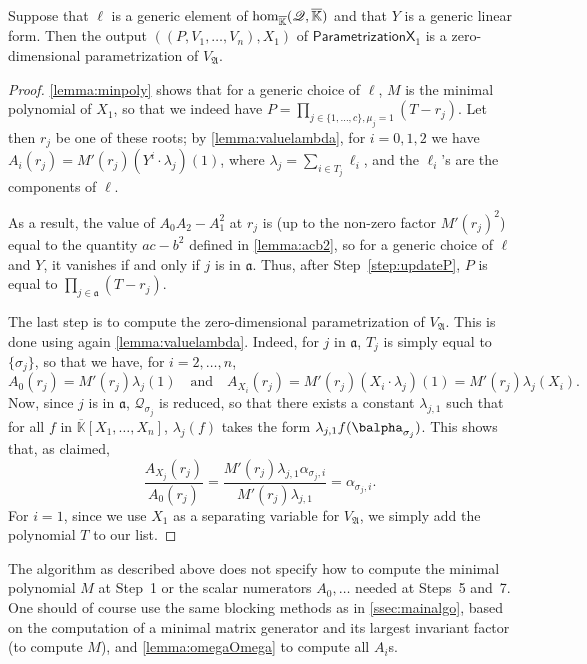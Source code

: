 \documentclass[12pt]{article}
\newcommand{\mf}{Y}
\newcommand{\residueI}{\mathscr{Q}}
\def\Kbar {{\ensuremath{\overline{\mathbb{K}}}}}
\begin{document}
\begin{lemma}
	Suppose that $\ell$ is a generic element of ${\rm
		hom}_{\Kbar}(\residueI,\Kbar)$ and that $\mf$ is a generic linear form. Then
	the output $((P,V_1,\dots,V_n),X_1)$ of
	$\mathsf{ParametrizationX}_1$ is a zero-dimensional
	parametrization of $V_{\mathfrak{A}}$.
\end{lemma}
\begin{proof}
  \cref{lemma:minpoly} shows that for a generic choice of $\ell$,
  $M$ is the minimal polynomial of $X_1$, so that we indeed have
  $P=\prod_{j \in \{1,\dots,c\}, \mu_j=1} (T-r_j)$. Let then $r_j$ be
  one of these roots; by \cref{lemma:valuelambda}, for $i=0,1,2$
  we have $ A_i(r_j) = M'(r_j) (\mf^i \cdot \lambda_j)(1)$, where
  $\lambda_j =\sum_{i \in T_j} \ell_i$, and the $\ell_i$'s are the
  components of $\ell$. 
  
  As a result, the value of $ A_0  A_2 -  A_1^2$ at
  $r_j$ is (up to the non-zero factor $M'(r_j)^2$) equal to the
  quantity $ac-b^2$ defined in \cref{lemma:acb2}, so for a
  generic choice of $\ell$ and $\mf$, it vanishes if and only if $j$ is
  in $\mathfrak{a}$. Thus, after Step~\ref{step:updateP}, 
  $P$ is equal to $\prod_{j \in \mathfrak{a}} (T-r_j)$.
	
  The last step is to compute the zero-dimensional parametrization of
  $V_{\mathfrak{A}}$. This is done using again
  \cref{lemma:valuelambda}. Indeed, for $j$ in $\mathfrak{a}$, 
  $T_j$ is simply equal to $\{\sigma_j\}$, so that we have, for $i=2,\dots,n$,
  $$ A_0(r_j)=M'(r_j) \lambda_j(1) \quad\text{and}\quad 
  A_{X_i}(r_j) = M'(r_j) (X_i \cdot \lambda_j)(1) = M'(r_j) \lambda_j(X_i).$$ Now, since $j$
  is in $\mathfrak{a}$, $\residueI_{\sigma_j}$ is reduced, so that there
  exists a constant $\lambda_{j,1}$ such that for all $f$ in
  $\Kbar[X_1,\dots,X_n]$, $\lambda_j(f)$ takes the form $\lambda_{j,1}
  f(\balpha_{\sigma_j})$. This shows that, as claimed,
  $$\frac{ A_{X_j}(r_j)}{ A_0 (r_j)} = 
  \frac
      {M'(r_j) \lambda_{j,1} \alpha_{\sigma_j,i}}{M'(r_j) \lambda_{j,1}} = \alpha_{\sigma_j,i}.$$
      For $i=1$, since we use $X_1$ as a separating variable for $V_{\mathfrak{A}}$, 
      we simply add the polynomial $T$ to our list.
\end{proof}

The algorithm as described above does not specify how to compute the
minimal polynomial $M$ at Step~1 or the scalar numerators $A_0,\dots$
needed at Steps~5 and~7. One should of course use the same blocking
methods as in \cref{ssec:mainalgo}, based on the computation of a
minimal matrix generator and its largest invariant factor (to compute $M$), and
\cref{lemma:omegaOmega} to compute all $A_i$s.
\end{document}
